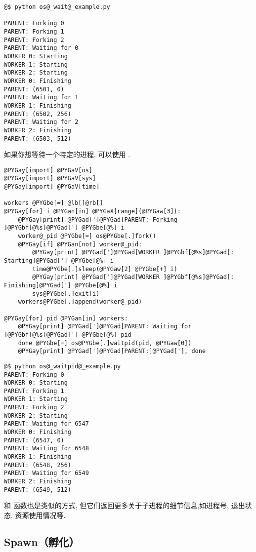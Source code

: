 \documentclass[a4paper,10pt,english]{manual}
\begin{document}
\begin{Verbatim}[commandchars=@\[\]]
@$ python os@_wait@_example.py

PARENT: Forking 0
PARENT: Forking 1
PARENT: Forking 2
PARENT: Waiting for 0
WORKER 0: Starting
WORKER 1: Starting
WORKER 2: Starting
WORKER 0: Finishing
PARENT: (6501, 0)
PARENT: Waiting for 1
WORKER 1: Finishing
PARENT: (6502, 256)
PARENT: Waiting for 2
WORKER 2: Finishing
PARENT: (6503, 512)
\end{Verbatim}

如果你想等待一个特定的进程, 可以使用  .

\begin{Verbatim}[commandchars=@\[\]]
@PYGay[import] @PYGaV[os]
@PYGay[import] @PYGaV[sys]
@PYGay[import] @PYGaV[time]

workers @PYGbe[=] @lb[]@rb[]
@PYGay[for] i @PYGan[in] @PYGaX[range](@PYGaw[3]):
    @PYGay[print] @PYGad[']@PYGad[PARENT: Forking ]@PYGbf[@%s]@PYGad['] @PYGbe[@%] i
    worker@_pid @PYGbe[=] os@PYGbe[.]fork()
    @PYGay[if] @PYGan[not] worker@_pid:
        @PYGay[print] @PYGad[']@PYGad[WORKER ]@PYGbf[@%s]@PYGad[: Starting]@PYGad['] @PYGbe[@%] i
        time@PYGbe[.]sleep(@PYGaw[2] @PYGbe[+] i)
        @PYGay[print] @PYGad[']@PYGad[WORKER ]@PYGbf[@%s]@PYGad[: Finishing]@PYGad['] @PYGbe[@%] i
        sys@PYGbe[.]exit(i)
    workers@PYGbe[.]append(worker@_pid)

@PYGay[for] pid @PYGan[in] workers:
    @PYGay[print] @PYGad[']@PYGad[PARENT: Waiting for ]@PYGbf[@%s]@PYGad['] @PYGbe[@%] pid
    done @PYGbe[=] os@PYGbe[.]waitpid(pid, @PYGaw[0])
    @PYGay[print] @PYGad[']@PYGad[PARENT:]@PYGad['], done
\end{Verbatim}

\begin{Verbatim}[commandchars=@\[\]]
@$ python os@_waitpid@_example.py
PARENT: Forking 0
WORKER 0: Starting
PARENT: Forking 1
WORKER 1: Starting
PARENT: Forking 2
WORKER 2: Starting
PARENT: Waiting for 6547
WORKER 0: Finishing
PARENT: (6547, 0)
PARENT: Waiting for 6548
WORKER 1: Finishing
PARENT: (6548, 256)
PARENT: Waiting for 6549
WORKER 2: Finishing
PARENT: (6549, 512)
\end{Verbatim}

 和  函数也是类似的方式, 但它们返回更多关于子进程的细节信息,如进程号, 退出状态, 资源使用情况等.


\subsection{Spawn（孵化）}
\end{document}
